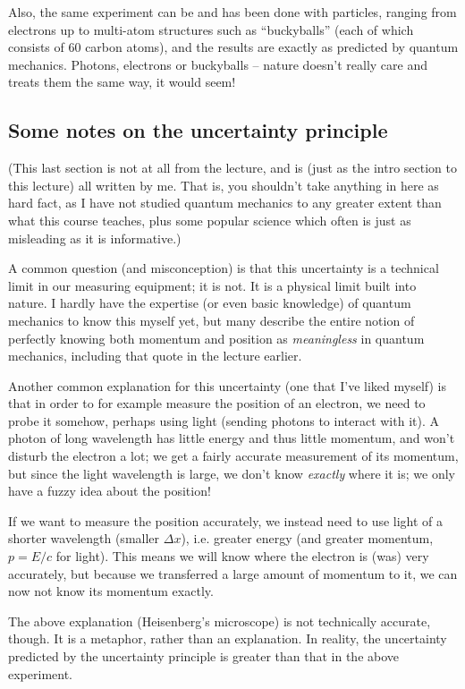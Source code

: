 \documentclass[8.01x]{subfiles}
\begin{document}
Also, the same experiment can be and has been done with particles, ranging from electrons up to multi-atom structures such as ``buckyballs'' (each of which consists of 60 carbon atoms), and the results are exactly as predicted by quantum mechanics. Photons, electrons or buckyballs -- nature doesn't really care and treats them the same way, it would seem!

\subsection{Some notes on the uncertainty principle}

(This last section is not at all from the lecture, and is (just as the intro section to this lecture) all written by me. That is, you shouldn't take anything in here as hard fact, as I have not studied quantum mechanics to any greater extent than what this course teaches, plus some popular science which often is just as misleading as it is informative.)

A common question (and misconception) is that this uncertainty is a technical limit in our measuring equipment; it is not. It is a physical limit built into nature. I hardly have the expertise (or even basic knowledge) of quantum mechanics to know this myself yet, but many describe the entire notion of perfectly knowing both momentum and position as \emph{meaningless} in quantum mechanics, including that quote in the lecture earlier.

Another common explanation for this uncertainty (one that I've liked myself) is that in order to for example measure the position of an electron, we need to probe it somehow, perhaps using light (sending photons to interact with it). A photon of long wavelength has little energy and thus little momentum, and won't disturb the electron a lot; we get a fairly accurate measurement of its momentum, but since the light wavelength is large, we don't know \emph{exactly} where it is; we only have a fuzzy idea about the position!

If we want to measure the position accurately, we instead need to use light of a shorter wavelength (smaller $\Delta x$), i.e. greater energy (and greater momentum, $p = E/c$ for light). This means we will know where the electron is (was) very accurately, but because we transferred a large amount of momentum to it, we can now not know its momentum exactly.

The above explanation (Heisenberg's microscope) is not technically accurate, though. It is a metaphor, rather than an explanation. In reality, the uncertainty predicted by the uncertainty principle is greater than that in the above experiment.
\end{document}
